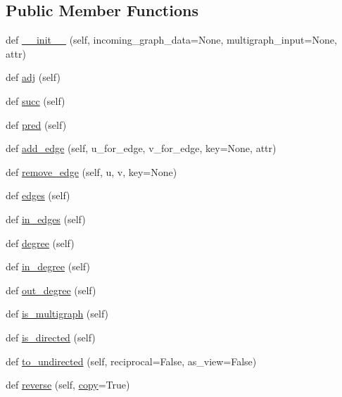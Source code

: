 \subsection*{Public Member Functions}
\begin{DoxyCompactItemize}
\item 
def \hyperlink{classnetworkx_1_1classes_1_1multidigraph_1_1MultiDiGraph_a1e28b57783d487534bf6e26291bca8b8}{\+\_\+\+\_\+init\+\_\+\+\_\+} (self, incoming\+\_\+graph\+\_\+data=None, multigraph\+\_\+input=None, attr)
\item 
def \hyperlink{classnetworkx_1_1classes_1_1multidigraph_1_1MultiDiGraph_aa91b54bd53ee46766de3fa6abd016275}{adj} (self)
\item 
def \hyperlink{classnetworkx_1_1classes_1_1multidigraph_1_1MultiDiGraph_ae9c211f47e47ad671cfa48d3af7d3d38}{succ} (self)
\item 
def \hyperlink{classnetworkx_1_1classes_1_1multidigraph_1_1MultiDiGraph_a18232cc53022ce5781915dfa22a9a4c4}{pred} (self)
\item 
def \hyperlink{classnetworkx_1_1classes_1_1multidigraph_1_1MultiDiGraph_ab9967eefa32e2aba30bbc8efb08522e7}{add\+\_\+edge} (self, u\+\_\+for\+\_\+edge, v\+\_\+for\+\_\+edge, key=None, attr)
\item 
def \hyperlink{classnetworkx_1_1classes_1_1multidigraph_1_1MultiDiGraph_a843fdbf2ba1f538d53a98d44d3449464}{remove\+\_\+edge} (self, u, v, key=None)
\item 
def \hyperlink{classnetworkx_1_1classes_1_1multidigraph_1_1MultiDiGraph_a116c40637e7a1835a9f1642fdee198ce}{edges} (self)
\item 
def \hyperlink{classnetworkx_1_1classes_1_1multidigraph_1_1MultiDiGraph_a5947a3cfb062e1856db0eec3a70cac42}{in\+\_\+edges} (self)
\item 
def \hyperlink{classnetworkx_1_1classes_1_1multidigraph_1_1MultiDiGraph_a957f3f3e1f84e83c50360a486305c115}{degree} (self)
\item 
def \hyperlink{classnetworkx_1_1classes_1_1multidigraph_1_1MultiDiGraph_a1ed0da17d51447a6df05c7dd5cfd0a80}{in\+\_\+degree} (self)
\item 
def \hyperlink{classnetworkx_1_1classes_1_1multidigraph_1_1MultiDiGraph_a99f54c92adbb522afd3879d965b6837d}{out\+\_\+degree} (self)
\item 
def \hyperlink{classnetworkx_1_1classes_1_1multidigraph_1_1MultiDiGraph_ac6afa275924777e84153a30765e65df7}{is\+\_\+multigraph} (self)
\item 
def \hyperlink{classnetworkx_1_1classes_1_1multidigraph_1_1MultiDiGraph_a68a4d9c9228d427c4b2c2cb96090b14c}{is\+\_\+directed} (self)
\item 
def \hyperlink{classnetworkx_1_1classes_1_1multidigraph_1_1MultiDiGraph_a25c55ef57000f8467da36bca3989930e}{to\+\_\+undirected} (self, reciprocal=False, as\+\_\+view=False)
\item 
def \hyperlink{classnetworkx_1_1classes_1_1multidigraph_1_1MultiDiGraph_ad4cf991d396acd5bec6bbc4b95639600}{reverse} (self, \hyperlink{classnetworkx_1_1classes_1_1multigraph_1_1MultiGraph_ab39351b96b86b8717820cec0c7f72400}{copy}=True)
\end{DoxyCompactItemize}
